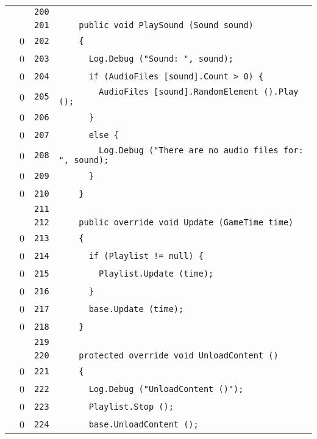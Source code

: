 \documentclass[a4paper,10pt]{article}
\begin{document}
\begin{longtable}[l]{lrrl}
\cellcolor{gray} &  & \verb~200~ & \verb~~\\
\cellcolor{gray} &  & \verb~201~ & \verb~    public void PlaySound (Sound sound)~\\
\cellcolor{red} & 0 & \verb~202~ & \verb~    {~\\
\cellcolor{red} & 0 & \verb~203~ & \verb~      Log.Debug ("Sound: ", sound);~\\
\cellcolor{red} & 0 & \verb~204~ & \verb~      if (AudioFiles [sound].Count > 0) {~\\
\cellcolor{red} & 0 & \verb~205~ & \verb~        AudioFiles [sound].RandomElement ().Play ();~\\
\cellcolor{red} & 0 & \verb~206~ & \verb~      }~\\
\cellcolor{red} & 0 & \verb~207~ & \verb~      else {~\\
\cellcolor{red} & 0 & \verb~208~ & \verb~        Log.Debug ("There are no audio files for: ", sound);~\\
\cellcolor{red} & 0 & \verb~209~ & \verb~      }~\\
\cellcolor{red} & 0 & \verb~210~ & \verb~    }~\\
\cellcolor{gray} &  & \verb~211~ & \verb~~\\
\cellcolor{gray} &  & \verb~212~ & \verb~    public override void Update (GameTime time)~\\
\cellcolor{red} & 0 & \verb~213~ & \verb~    {~\\
\cellcolor{red} & 0 & \verb~214~ & \verb~      if (Playlist != null) {~\\
\cellcolor{red} & 0 & \verb~215~ & \verb~        Playlist.Update (time);~\\
\cellcolor{red} & 0 & \verb~216~ & \verb~      }~\\
\cellcolor{red} & 0 & \verb~217~ & \verb~      base.Update (time);~\\
\cellcolor{red} & 0 & \verb~218~ & \verb~    }~\\
\cellcolor{gray} &  & \verb~219~ & \verb~~\\
\cellcolor{gray} &  & \verb~220~ & \verb~    protected override void UnloadContent ()~\\
\cellcolor{red} & 0 & \verb~221~ & \verb~    {~\\
\cellcolor{red} & 0 & \verb~222~ & \verb~      Log.Debug ("UnloadContent ()");~\\
\cellcolor{red} & 0 & \verb~223~ & \verb~      Playlist.Stop ();~\\
\cellcolor{red} & 0 & \verb~224~ & \verb~      base.UnloadContent ();~\\

\end{longtable}
\end{document}
